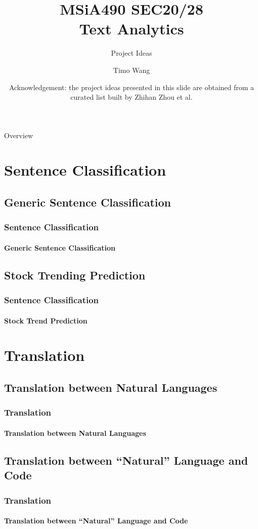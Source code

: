 \documentclass{beamer}
\begin{document}
\title{MSiA490 SEC20/28\\ Text Analytics}
\subtitle{Project Ideas}
\author{Timo Wang}
\date{\tiny Acknowledgement: the project ideas presented in this slide are obtained from a curated list built by Zhihan Zhou et al.}

\begin{frame}
    \titlepage
\end{frame}

\begin{frame}{Overview}
    \tableofcontents[hideallsubsections]
\end{frame}

\section{Sentence Classification}
\subsection{Generic Sentence Classification}
\begin{frame}
    \frametitle{Sentence Classification}
    \framesubtitle{Generic Sentence Classification}
\end{frame}

\subsection{Stock Trending Prediction}
\begin{frame}
    \frametitle{Sentence Classification}
    \framesubtitle{Stock Trend Prediction}
\end{frame}

\section{Translation}
\subsection{Translation between Natural Languages}
\begin{frame}
    \frametitle{Translation}
    \framesubtitle{Translation between Natural Languages}
\end{frame}

\subsection{Translation between ``Natural'' Language and Code}
\begin{frame}
    \frametitle{Translation}
    \framesubtitle{Translation between ``Natural'' Language and Code}
\end{frame}
\end{document}
